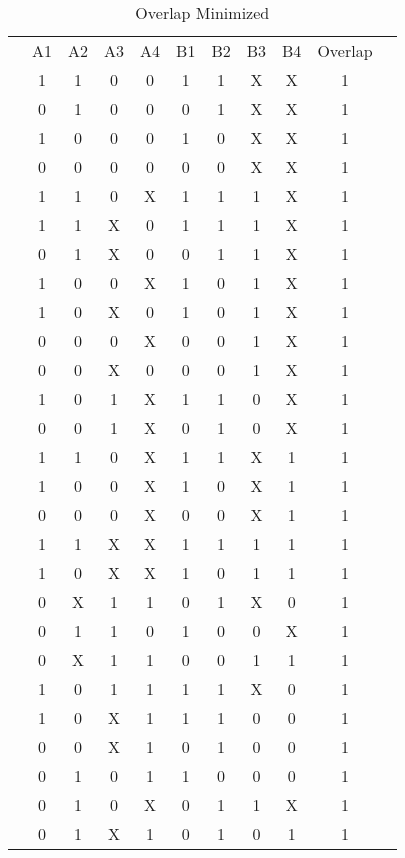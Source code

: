 \documentclass[letterpaper,titlepage,oneside]{article}
\begin{document}
\begin{table}[h!]
\begin{center}

\begin{tabular}{c|c|c|c|c|c|c|c|c|c|c}
\cline{2-10}
 & A1 & A2 & A3 & A4 & B1 & B2 & B3 & B4 & Overlap &  \\ \cline{2-10}
 & 1 & 1 & 0 & 0 & 1 & 1 & X & X & 1 &  \\
 & 0 & 1 & 0 & 0 & 0 & 1 & X & X & 1 &  \\
 & 1 & 0 & 0 & 0 & 1 & 0 & X & X & 1 &  \\
 & 0 & 0 & 0 & 0 & 0 & 0 & X & X & 1 &  \\
 & 1 & 1 & 0 & X & 1 & 1 & 1 & X & 1 &  \\
 & 1 & 1 & X & 0 & 1 & 1 & 1 & X & 1 &  \\
 & 0 & 1 & X & 0 & 0 & 1 & 1 & X & 1 &  \\
 & 1 & 0 & 0 & X & 1 & 0 & 1 & X & 1 &  \\
 & 1 & 0 & X & 0 & 1 & 0 & 1 & X & 1 &  \\
 & 0 & 0 & 0 & X & 0 & 0 & 1 & X & 1 &  \\
 & 0 & 0 & X & 0 & 0 & 0 & 1 & X & 1 &  \\
 & 1 & 0 & 1 & X & 1 & 1 & 0 & X & 1 &  \\
 & 0 & 0 & 1 & X & 0 & 1 & 0 & X & 1 &  \\
 & 1 & 1 & 0 & X & 1 & 1 & X & 1 & 1 &  \\
 & 1 & 0 & 0 & X & 1 & 0 & X & 1 & 1 &  \\
 & 0 & 0 & 0 & X & 0 & 0 & X & 1 & 1 &  \\
 & 1 & 1 & X & X & 1 & 1 & 1 & 1 & 1 &  \\
 & 1 & 0 & X & X & 1 & 0 & 1 & 1 & 1 &  \\
 & 0 & X & 1 & 1 & 0 & 1 & X & 0 & 1 &  \\
 & 0 & 1 & 1 & 0 & 1 & 0 & 0 & X & 1 &  \\
 & 0 & X & 1 & 1 & 0 & 0 & 1 & 1 & 1 &  \\
 & 1 & 0 & 1 & 1 & 1 & 1 & X & 0 & 1 &  \\
 & 1 & 0 & X & 1 & 1 & 1 & 0 & 0 & 1 &  \\
 & 0 & 0 & X & 1 & 0 & 1 & 0 & 0 & 1 &  \\
 & 0 & 1 & 0 & 1 & 1 & 0 & 0 & 0 & 1 &  \\
 & 0 & 1 & 0 & X & 0 & 1 & 1 & X & 1 &  \\
 & 0 & 1 & X & 1 & 0 & 1 & 0 & 1 & 1 &  \\
\cline{2-10}
\end{tabular}

\caption{Overlap Minimized}\label{table:OverLap_Minimized}

\end{center}
\end{table}
\end{document}
